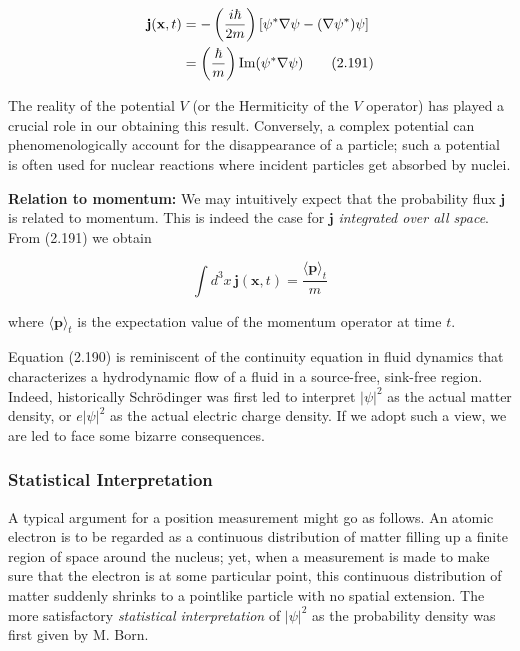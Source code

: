\documentclass[11pt,a4paper]{article}
\begin{document}
\begin{align}
\mathbf{j}(\mathbf{x}, t) &= -\left(\frac{i\hbar}{2m}\right)[\psi^*\nabla\psi - (\nabla\psi^*)\psi] \notag \\
&= \left(\frac{\hbar}{m}\right)\text{Im}(\psi^*\nabla\psi)
\tag{2.191}
\end{align}

The reality of the potential $V$ (or the Hermiticity of the $V$ operator) has played a crucial role in our obtaining this result. Conversely, a complex potential can phenomenologically account for the disappearance of a particle; such a potential is often used for nuclear reactions where incident particles get absorbed by nuclei.

\textbf{Relation to momentum:}
We may intuitively expect that the probability flux $\mathbf{j}$ is related to momentum. This is indeed the case for $\mathbf{j}$ \textit{integrated over all space}. From (2.191) we obtain

\begin{equation}
\int d^3x\, \mathbf{j}(\mathbf{x}, t) = \frac{\langle \mathbf{p}\rangle_t}{m}
\tag{2.192}
\end{equation}

where $\langle \mathbf{p}\rangle_t$ is the expectation value of the momentum operator at time $t$.

Equation (2.190) is reminiscent of the continuity equation in fluid dynamics that characterizes a hydrodynamic flow of a fluid in a source-free, sink-free region. Indeed, historically Schrödinger was first led to interpret $|\psi|^2$ as the actual matter density, or $e|\psi|^2$ as the actual electric charge density. If we adopt such a view, we are led to face some bizarre consequences.

\subsubsection{Statistical Interpretation}

A typical argument for a position measurement might go as follows. An atomic electron is to be regarded as a continuous distribution of matter filling up a finite region of space around the nucleus; yet, when a measurement is made to make sure that the electron is at some particular point, this continuous distribution of matter suddenly shrinks to a pointlike particle with no spatial extension. The more satisfactory \textit{statistical interpretation} of $|\psi|^2$ as the probability density was first given by M. Born.
\end{document}
